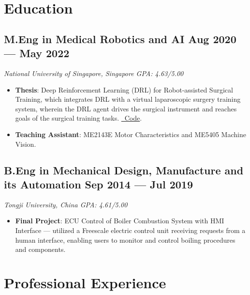 \documentclass[a4paper,10pt]{article}
\newcommand{\subtextit}[1]{
\vspace{0cm} 
\textit{ #1 
\vspace{-0.1cm}} }
\newenvironment{zitemize}{
\vspace{0.1cm}
\begin{itemize}\itemsep 1.5pt \parskip 2pt \parsep 5pt}
{\end{itemize}\vspace{-0.3cm}}
\begin{document}
\section{Education}
\subsection*{\large M.Eng in Medical Robotics and AI \hfill Aug 2020 --- May 2022} 
\subtextit{National University of Singapore, Singapore \hfill GPA: 4.63/5.00}
\begin{zitemize}
    \item \textbf{Thesis}: Deep Reinforcement Learning (DRL) for Robot-assisted Surgical Training, which integrates DRL with a virtual laparoscopic surgery training system, wherein the DRL agent drives the surgical instrument and reaches goals of the surgical training tasks. \href{https://github.com/Kexin-Wei/Soft-tissue-deformation-in-laparoscopic-surgery-planning-with-DRL}{\faGithub~Code}.
    \item \textbf{Teaching Assistant}: ME2143E Motor Characteristics and ME5405 Machine Vision.
\end{zitemize}

\subsection*{\large B.Eng in Mechanical Design, Manufacture and its Automation \hfill Sep 2014 --- Jul 2019} 
\subtextit{Tongji University, China \hfill GPA: 4.61/5.00}
\begin{zitemize}
    \item \textbf{Final Project}: ECU Control of Boiler Combustion System with HMI Interface --- utilized a Freescale electric control unit receiving requests from a human interface, enabling users to monitor and control boiling procedures and components.
\end{zitemize}

\section{Professional Experience}
\end{document}
